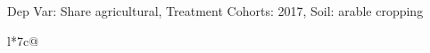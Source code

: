 \begin{table}[H]
\captionlistentry[table]{}
\label{table:beaver_land_class_DVis_land_class_1_SCg2_SSAC}
\scriptsize %
Dep Var: Share agricultural, Treatment Cohorts: 2017, Soil: arable cropping \\
\begin{threeparttable}
\begin{tabulary}{\textwidth}{l*{7}{c}@{}}
\toprule \toprule
\noalign{\smallskip}
\noalign{\smallskip}
\midrule \bottomrule
\end{tabulary}
\medskip
\end{threeparttable}
\end{table}
